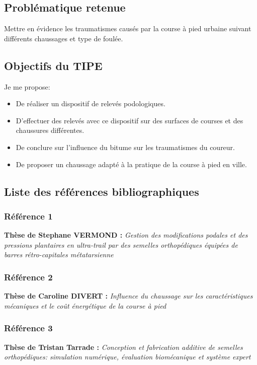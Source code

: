\documentclass[11pt]{article}
\begin{document}
\subsection{Problématique retenue}
\label{sec:org3fecb82}
Mettre en évidence les traumatismes causés par la course à pied urbaine suivant différents chaussages et type de foulée.\\\empty
\subsection{Objectifs du TIPE}
\label{sec:orgf727255}
Je me propose:\\\empty
\begin{itemize}
\item De réaliser un dispositif de relevés podologiques.\\\empty
\item D'effectuer des relevés avec ce dispositif sur des surfaces de courses et des chaussures différentes.\\\empty
\item De conclure sur l'influence du bitume sur les traumatismes du coureur.\\\empty
\item De proposer un chaussage adapté à la pratique de la course à pied en ville.\\\empty
\end{itemize}

\subsection{Liste des références bibliographiques}
\label{sec:org41726c3}
\subsubsection{Référence 1}
\label{sec:org189dd71}
\textbf{Thèse de Stephane VERMOND :} \emph{Gestion des modifications podales et des pressions plantaires en ultra-trail par des semelles orthopédiques équipées de barres rétro-capitales métatarsienne}\\\empty
\subsubsection{Référence 2}
\label{sec:org76aaba0}
\textbf{Thèse de Caroline DIVERT :} \emph{Influence du chaussage sur les caractéristiques mécaniques et le coût énergétique de la course à pied}\\\empty
\subsubsection{Référence 3}
\label{sec:org7cf21f5}
\textbf{Thèse de Tristan Tarrade :} \emph{Conception et fabrication additive de semelles orthopédiques: simulation numérique, évaluation biomécanique et système expert}\\\empty
\end{document}
